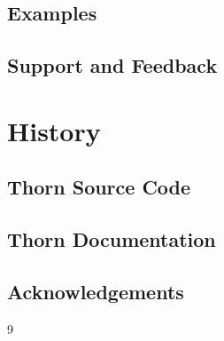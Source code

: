 \subsection{Examples}

\subsection{Support and Feedback}

\section{History}

\subsection{Thorn Source Code}

\subsection{Thorn Documentation}

\subsection{Acknowledgements}


\begin{thebibliography}{9}

\end{thebibliography}



